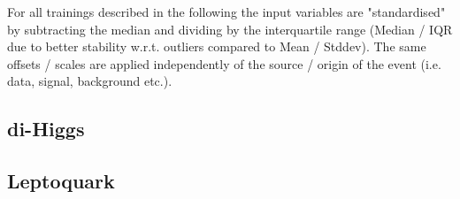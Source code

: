 For all trainings described in the following the input variables are "standardised" by subtracting the median and dividing by the interquartile range (Median / IQR due to better stability w.r.t. outliers compared to Mean / Stddev). The same offsets / scales are applied independently of the source / origin of the event (i.e. data, signal, background etc.). 


\subsection{di-Higgs}

\label{sec:mva_hh}

\subsection{Leptoquark}

\label{sec:mva_lq}
